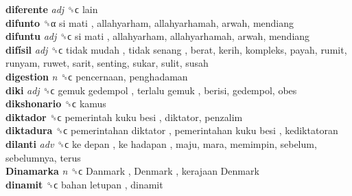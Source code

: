 \textbf{diferente} \emph{adj}  ␝ϲ  lain  \\
\textbf{difunto} ␝α   si mati , allahyarham, allahyarhamah, arwah, mendiang  \\
\textbf{difuntu} \emph{adj}  ␝ϲ   si mati , allahyarham, allahyarhamah, arwah, mendiang  \\
\textbf{difísil} \emph{adj}  ␝ϲ   tidak mudah ,  tidak senang , berat, kerih, kompleks, payah, rumit, runyam, ruwet, sarit, senting, sukar, sulit, susah  \\
\textbf{digestion} \emph{n}  ␝ϲ  pencernaan, penghadaman  \\
\textbf{diki} \emph{adj}  ␝ϲ   gemuk gedempol ,  terlalu gemuk , berisi, gedempol, obes  \\
\textbf{dikshonario} ␝ϲ  kamus  \\
\textbf{diktador} ␝ϲ   pemerintah kuku besi , diktator, penzalim  \\
\textbf{diktadura} ␝ϲ   pemerintahan diktator ,  pemerintahan kuku besi , kediktatoran  \\
\textbf{dilanti} \emph{adv}  ␝ϲ   ke depan ,  ke hadapan , maju, mara, memimpin, sebelum, sebelumnya, terus  \\
\textbf{Dinamarka} \emph{n}  ␝ϲ   Danmark ,  Denmark ,  kerajaan Denmark   \\
\textbf{dinamit} ␝ϲ   bahan letupan , dinamit  \\
